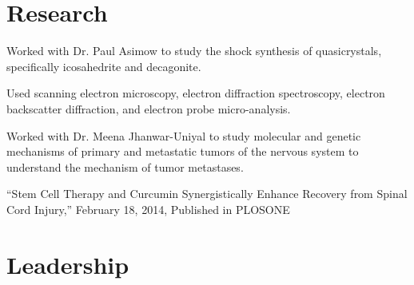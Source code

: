 \documentclass[letterpaper]{deedy-resume} %
\begin{document}
\begin{minipage}[t]{0.58\textwidth}



\section{Research}


\begin{tightitemize}
\item Worked with Dr. Paul Asimow to study the shock synthesis of quasicrystals, specifically icosahedrite and decagonite.
\item Used scanning electron microscopy, electron diffraction spectroscopy, electron backscatter diffraction, and electron probe micro-analysis.
\end{tightitemize}

\sectionspace


\begin{tightitemize}
\item Worked with Dr. Meena Jhanwar-Uniyal to study molecular and genetic mechanisms of primary and metastatic tumors of the nervous system to understand the mechanism of tumor metastases.
\item ``Stem Cell Therapy and Curcumin Synergistically Enhance Recovery from Spinal Cord Injury,'' February 18, 2014, Published in PLOSONE
\end{tightitemize}

\sectionspace %


\section{Leadership}


\end{minipage}
\end{document}
